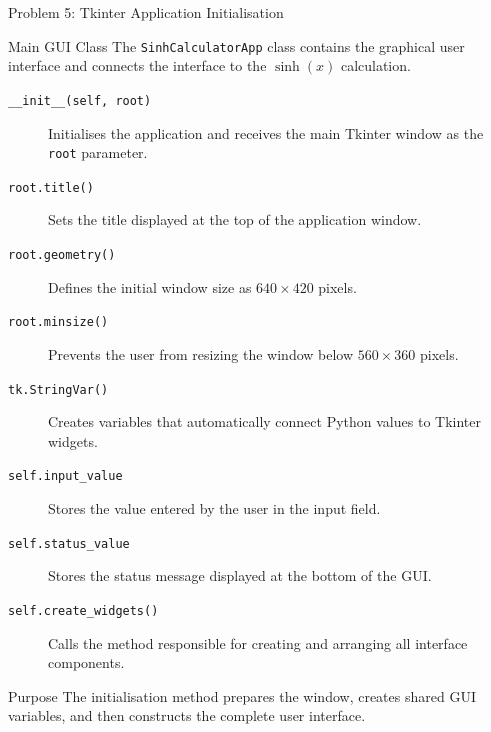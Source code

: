 \documentclass[aspectratio=169,11pt]{beamer}
\begin{document}
\begin{frame}[t]{Problem 5: Tkinter Application Initialisation}
\small

\begin{block}{Main GUI Class}
The \texttt{SinhCalculatorApp} class contains the graphical user
interface and connects the interface to the $\sinh(x)$ calculation.
\end{block}

\begin{description}

\item[\texttt{\_\_init\_\_(self, root)}]
Initialises the application and receives the main Tkinter window as
the \texttt{root} parameter.

\item[\texttt{root.title()}]
Sets the title displayed at the top of the application window.

\item[\texttt{root.geometry()}]
Defines the initial window size as $640 \times 420$ pixels.

\item[\texttt{root.minsize()}]
Prevents the user from resizing the window below
$560 \times 360$ pixels.

\item[\texttt{tk.StringVar()}]
Creates variables that automatically connect Python values to
Tkinter widgets.

\item[\texttt{self.input\_value}]
Stores the value entered by the user in the input field.

\item[\texttt{self.status\_value}]
Stores the status message displayed at the bottom of the GUI.

\item[\texttt{self.create\_widgets()}]
Calls the method responsible for creating and arranging all
interface components.

\end{description}

\begin{alertblock}{Purpose}
The initialisation method prepares the window, creates shared GUI
variables, and then constructs the complete user interface.
\end{alertblock}

\end{frame}


\end{document}
